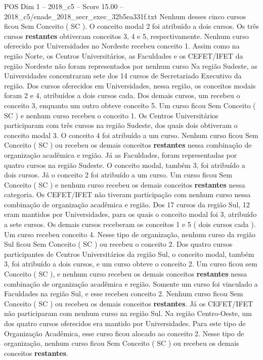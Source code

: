 \begin{textsample}{POS Dim 1 – 2018\_c5 – Score 15.00 – 2018\_c5/enade\_2018\_secr\_exec\_32b5ea331f.txt}
Nenhum desses cinco cursos ficou Sem Conceito ( SC ).
O conceito modal 2 foi atribuído a dois cursos.
Os três cursos \textbf{restantes} obtiveram conceitos 3, 4 e 5, respectivamente.
Nenhum curso oferecido por Universidades no Nordeste recebeu conceito 1.
Assim como na região Norte, os Centros Universitários, as Faculdades e os CEFET/IFET da região Nordeste não foram representados por nenhum curso Na região Sudeste, as Universidades concentraram sete dos 14 cursos de Secretariado Executivo da região.
Dos cursos oferecidos em Universidades, nessa região, os conceitos modais foram 2 e 4, atribuídos a dois cursos cada.
Dos demais cursos, um recebeu o conceito 3, enquanto um outro obteve conceito 5.
Um curso ficou Sem Conceito ( SC ) e nenhum curso recebeu o conceito 1.
Os Centros Universitários participaram com três cursos na região Sudeste, dos quais dois obtiveram o conceito modal 3.
O conceito 4 foi atribuído a um curso.
Nenhum curso ficou Sem Conceito ( SC ) ou recebeu os demais conceitos \textbf{restantes} nessa combinação de organização acadêmica e região.
Já as Faculdades, foram representadas por quatro cursos na região Sudeste.
O conceito modal, também 3, foi atribuído a dois cursos.
Já o conceito 2 foi atribuído a um curso.
Um curso ficou Sem Conceito ( SC ) e nenhum curso recebeu os demais conceitos \textbf{restantes} nessa categoria.
Os CEFET/IFET não tiveram participação com nenhum curso nessa combinação de organização acadêmica e região.
Dos 17 cursos da região Sul, 12 eram mantidos por Universidades, para os quais o conceito modal foi 3, atribuído a sete cursos.
Os demais cursos receberam os conceitos 1 e 5 ( dois cursos cada ).
Um curso recebeu conceito 4.
Nesse tipo de organização, nenhum curso da região Sul ficou Sem Conceito ( SC ) ou recebeu o conceito 2.
Dos quatro cursos participantes de Centros Universitários da região Sul, o conceito modal, também 3, foi atribuído a dois cursos, e um curso obteve o conceito 2.
Um curso ficou sem Conceito ( SC ), e nenhum curso recebeu os demais conceitos \textbf{restantes} nessa combinação de organização acadêmica e região.
Somente um curso foi vinculado a Faculdades na região Sul, e esse recebeu conceito 2.
Nenhum curso ficou Sem Conceito ( SC ) ou recebeu os demais conceitos \textbf{restantes}.
Já os CEFET/IFET não participaram com nenhum curso na região Sul.
Na região Centro-Oeste, um dos quatro cursos oferecidos era mantido por Universidades.
Para este tipo de Organização Acadêmica, esse curso ficou alocado ao conceito 2.
Nesse tipo de organização, nenhum curso ficou Sem Conceito ( SC ) ou recebeu os demais conceitos \textbf{restantes}.

\end{textsample}
